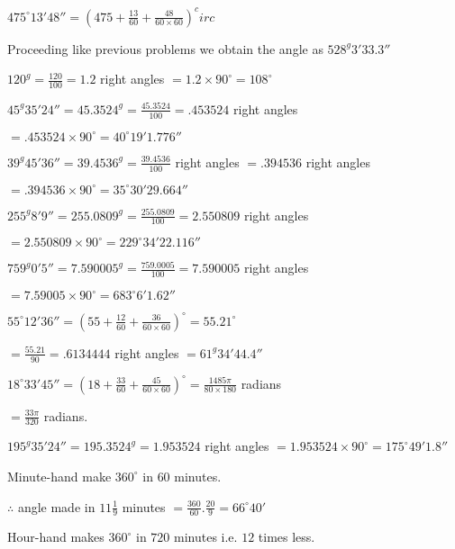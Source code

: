 \item $475^\circ13'48'' = \left(475 + \frac{13}{60} + \frac{48}{60\times 60}\right)^circ$

    Proceeding like previous problems we obtain the angle as $528^g3'33.3''$

\item $120^g = \frac{120}{100} = 1.2$ right angles $= 1.2\times 90^\circ = 108^\circ$

\item $45^g35'24'' = 45.3524^g = \frac{45.3524}{100} = .453524$ right angles

    $= .453524 \times 90^\circ = 40^\circ19'1.776''$

\item $39^g45'36'' = 39.4536^g = \frac{39.4536}{100}$ right angles $= .394536$ right angles

    $= .394536\times 90^\circ = 35^\circ30'29.664''$

\item $255^g8'9'' = 255.0809^g = \frac{255.0809}{100} = 2.550809$ right angles

    $= 2.550809 \times 90^\circ = 229^\circ34'22.116''$

\item $759^g0'5'' = 7.590005^g = \frac{759.0005}{100} = 7.590005$ right angles

    $= 7.59005\times 90^\circ = 683^\circ6'1.62''$

\item $55^\circ12'36'' = \left(55 + \frac{12}{60} + \frac{36}{60\times 60}\right)^\circ = 55.21^\circ$

    $= \frac{55.21}{90} = .6134444$ right angles $= 61^g34'44.4''$

\item $18^\circ33'45'' = \left(18 + \frac{33}{60} + \frac{45}{60\times60}\right)^\circ = \frac{1485\pi}{80\times180}$ radians

    $= \frac{33\pi}{320}$ radians.

\item $195^g35'24'' = 195.3524^g = 1.953524$ right angles $= 1.953524\times90^\circ = 175^\circ49'1.8''$

\item Minute-hand make $360^\circ$ in $60$ minutes.

    $\therefore$ angle made in $11\frac{1}{9}$ minutes $= \frac{360}{60}.\frac{20}{9} = 66^\circ40'$

    Hour-hand makes $360^\circ$ in $720$ minutes i.e. $12$ times less.

